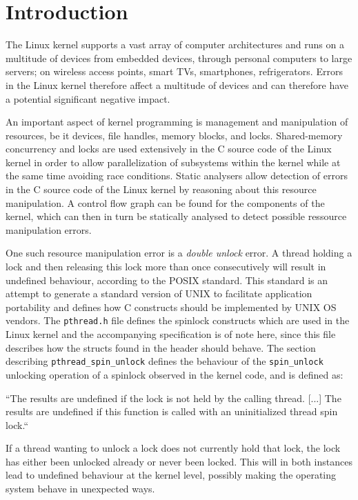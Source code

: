 \section{Introduction}

\newpar The Linux kernel supports a vast array of computer architectures and runs on a multitude of devices from embedded devices, through personal computers to large servers; on wireless
access points, smart TVs, smartphones, refrigerators.
Errors in the Linux kernel therefore affect a multitude of devices and can therefore have a potential significant negative impact.

\newpar An important aspect of kernel programming is management and manipulation of resources, be it devices, file handles, memory blocks, and locks. Shared-memory concurrency and locks are used extensively in the C source code of the Linux kernel in order to allow parallelization of subsystems within the kernel while at the same time avoiding race conditions. Static analysers allow detection of errors in the C source code of the Linux kernel by reasoning about this resource manipulation. A control flow graph can be found for the components of the kernel, which can then in turn be statically analysed to detect possible ressource manipulation errors.

\newpar One such resource manipulation error is a \textit{double unlock} error. A thread holding a lock and then releasing this lock more than once consecutively will result in undefined behaviour, according to the POSIX standard. This standard is an attempt to generate a standard version of UNIX to facilitate application portability and defines how C constructs should be implemented by UNIX OS vendors. The \texttt{pthread.h} file defines the spinlock constructs which are used in the Linux kernel and the accompanying specification is of note here, since this file describes how the structs found in the header should behave. The section describing \texttt{pthread\_spin\_unlock} defines the behaviour of the \texttt{spin\_unlock} unlocking operation of a spinlock observed in the kernel code, and is defined as:

\begin{center}
``The results are undefined if the lock is not held by the calling thread.
[...] 
The results are undefined if this function is called with an uninitialized thread spin lock.`` \cite{unlockPOSIX}
\end{center}

\newpar If a thread wanting to unlock a lock does not currently hold that lock, the lock has either been unlocked already or never been locked. This will in both instances lead to undefined behaviour at the kernel level, possibly making the operating system behave in unexpected ways.

